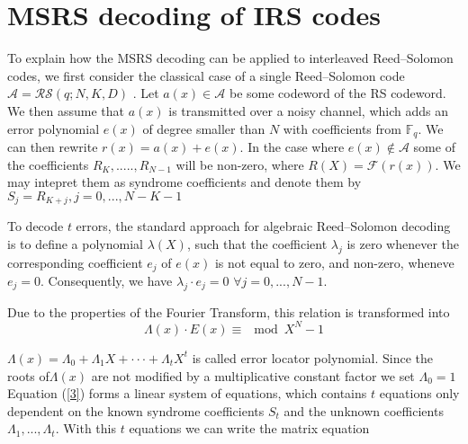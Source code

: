 \documentclass[fontsize=12pt]{article}
\begin{document}
\section{MSRS decoding of IRS codes}
To explain how the MSRS decoding can be applied to interleaved
Reed–Solomon codes, we first consider the classical
case of a single Reed–Solomon code $\mathcal{A} =\mathcal{RS}(q;N,K,D) $ .
Let $a(x) \in \mathcal{A}$ be some codeword of the RS codeword.
We then assume that $a(x)$ is transmitted over a noisy channel, which adds an error
polynomial $e(x)$ of degree smaller than $N$ with coefficients from $\mathbb{F}_q$.
We can then rewrite $r(x)=a(x)+e(x)$. In the case where $e(x) \notin \mathcal{A}$
some of the coefficients $R_K,.....,R_{N-1}$ will be non-zero, where $R(X)=\mathscr{F}(r(x))$. We may intepret them as syndrome coefficients and denote them by  $S_j = R_{K+j}, j= 0,...,N-K-1$

To decode $t$ errors, the standard approach for algebraic
Reed–Solomon decoding is to define a polynomial $\lambda(X)$, such
that the coefficient $\lambda_j$ is zero whenever the corresponding
coefficient $e_j$ of $e(x)$ is not equal to zero, and non-zero,
wheneve$e_j=0$. Consequently, we have $\lambda_j\cdot e_j = 0 \,\, \forall j = 0,...,N-1$.

Due to the properties of the Fourier Transform,
this relation is transformed into
\begin{equation}
\Lambda(x)\cdot E(x) \equiv \mod X^N -1
\label{3}
\end{equation}

$\Lambda(x)= \Lambda_0 +\Lambda_1X+\cdot\cdot\cdot + \Lambda_tX^t$ is called error
locator polynomial.
Since the roots of$\Lambda(x)$ are not modified
by a multiplicative constant factor we set $\Lambda_0=1$
Equation (\ref{3}) forms a linear system of equations, which
contains $t$ equations only dependent on the known syndrome
coefficients  $S_t$ and the unknown coefficients $\Lambda_1,..., \Lambda_t$. With this $t$ equations we can write the matrix equation
\end{document}
